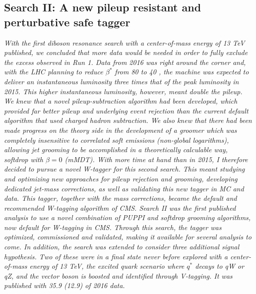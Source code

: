 \vspace*{\fill}
\begin{centering}
\chapter{Search II: A new pileup resistant and perturbative safe tagger}
\label{searchII}
\textit{
\noindent With the first diboson resonance search with a center-of-mass energy of 13 TeV published, we concluded that more data would be needed in order to fully exclude the excess observed in Run 1. Data from 2016 was right around the corner and, with the LHC planning to reduce $\beta^*$ from 80 to 40 \cm, the machine was expected to deliver an instantaneous luminosity three times that of the peak luminosity in 2015. This higher instantaneous luminosity, however, meant double the pileup.
\newline
\newline
We knew that a novel pileup-subtraction algorithm had been developed, which provided far better pileup and underlying event rejection than the current default algorithm that used charged hadron subtraction. We also knew that there had been made progress on the theory side in the development of a groomer which was completely insensitive to correlated soft emissions (non-global logarithms), allowing jet grooming to be accomplished in a theoretically calculable way, softdrop with $\beta = 0$ (mMDT).
\newline
\newline
With more time at hand than in 2015, I therefore decided to pursue a novel W-tagger for this second search. This meant studying and optimizing new approaches for pileup rejection and grooming, developing dedicated jet-mass corrections, as well as validating this new tagger in MC and data. This tagger, together with the mass corrections, became the default and recommended W-tagging algorithm of CMS.
\newline
\newline
Search II was the first published analysis to use a novel combination of PUPPI and softdrop grooming algorithms, now default for W-tagging in CMS. Through this search, the tagger was optimized, commissioned and validated, making it available for several analysis to come. In addition, the search was extended to consider three additional signal hypothesis. Two of these were in a final state never before explored with a center-of-mass energy of 13 TeV, the excited quark scenario where $q^*$ decays to qW or qZ, and the vector boson is boosted and identified through V-tagging. It was published with 35.9 (12.9) \fbinv of 2016 data.
}
\end{centering}
